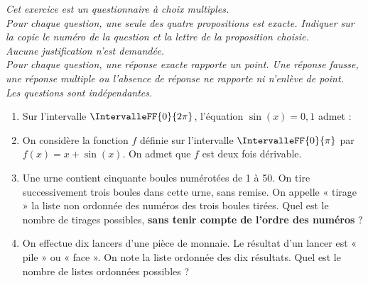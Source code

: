 \emph{Cet exercice est un questionnaire à choix multiples.\\
Pour chaque question, une seule des quatre propositions est exacte. Indiquer sur la copie le numéro de la question et la lettre de la proposition choisie.\\
Aucune justification n’est demandée.\\
Pour chaque question, une réponse exacte rapporte un point. Une réponse fausse, une réponse multiple ou l’absence de réponse ne rapporte ni n’enlève de point.\\
Les questions sont indépendantes.}

\bigskip

\begin{enumerate}
	\item Sur l’intervalle $\IntervalleFF{0}{2\pi}$, l’équation $\sin(x) = 0,1$ admet :
	
	\medskip
	
	\item On considère la fonction $f$ définie sur l’intervalle $\IntervalleFF{0}{\pi}$ par $f(x) = x + \sin(x)$. On admet que $f$ est deux fois dérivable.
	
	\medskip
	
	\item Une urne contient cinquante boules numérotées de 1 à 50. On tire successivement trois boules dans cette urne, sans remise. On appelle « tirage » la liste non ordonnée des numéros des trois boules tirées. Quel est le nombre de tirages possibles, \textbf{sans tenir compte de l’ordre des numéros} ?
	
	\medskip
	
	\item On effectue dix lancers d’une pièce de monnaie. Le résultat d’un lancer est « pile » ou « face ». On note la liste ordonnée des dix résultats. Quel est le nombre de listes ordonnées possibles ?
	

\end{enumerate}

